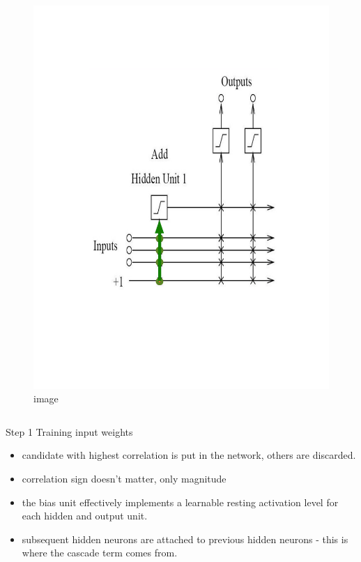 \documentclass[presentation]{beamer}
\begin{document}
\begin{frame}
\begin{columns}[t]
\begin{column}{0.5\textwidth}
\begin{figure}
        \includegraphics[scale=0.5]{trainInputunit.png}
        \caption{image}
      \end{figure}			
		\end{column}
	\end{columns}
\end{frame}



\begin{frame}{Step 1 Training input weights}
  \begin{itemize}
    \item candidate with highest correlation is put in the network, others are discarded.
    \item correlation sign doesn't matter, only magnitude
    \item the bias unit effectively implements a learnable resting activation level for each hidden and output unit.
    \item subsequent hidden neurons are attached to previous hidden neurons - this is where the cascade term comes from.
  \end{itemize}
\end{frame}
\end{document}
